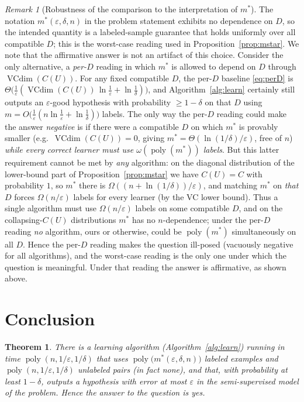 \documentclass{amsart}
\newtheorem{theorem}{Theorem}
\theoremstyle{definition}
\theoremstyle{remark}
\newtheorem{remark}{Remark}
\newcommand{\eps}{\varepsilon}
\DeclareMathOperator{\VCdim}{VCdim}
\DeclareMathOperator{\poly}{poly}
\begin{document}
\begin{remark}[Robustness of the comparison to the interpretation of $m^*$]
\label{rem:robust}
The notation $m^*(\eps,\delta,n)$ in the problem statement exhibits no
dependence on $D$, so the intended quantity is a labeled-sample guarantee that
holds uniformly over all compatible $D$; this is the worst-case reading used in
Proposition~\ref{prop:mstar}. We note that the affirmative answer is not an
artifact of this choice. Consider the only alternative, a \emph{per-$D$} reading
in which $m^*$ is allowed to depend on $D$ through $\VCdim(C(U))$. For any fixed
compatible $D$, the per-$D$ baseline \eqref{eq:perD} is
$\Theta\big(\tfrac1\eps(\VCdim(C(U))\,\ln\tfrac1\eps+\ln\tfrac1\delta)\big)$,
and Algorithm~\ref{alg:learn} certainly still outputs an $\eps$-good hypothesis
with probability $\ge 1-\delta$ on that $D$ using
$m=O\big(\tfrac1\eps(n\ln\tfrac1\eps+\ln\tfrac1\delta)\big)$ labels. The only
way the per-$D$ reading could make the answer \emph{negative} is if there were a
compatible $D$ on which $m^*$ is provably smaller (e.g.\ $\VCdim(C(U))=0$, giving
$m^*=\Theta(\ln(1/\delta)/\eps)$, free of $n$) \emph{while every correct learner
must use $\omega(\poly(m^*))$ labels}. But this latter requirement cannot be met
by \emph{any} algorithm: on the diagonal distribution of the lower-bound part of
Proposition~\ref{prop:mstar} we have $C(U)=C$ with probability $1$, so $m^*$
there is $\Omega((n+\ln(1/\delta))/\eps)$, and matching $m^*$ on \emph{that} $D$
forces $\Omega(n/\eps)$ labels for every learner (by the VC lower bound). Thus a
single algorithm must use $\Omega(n/\eps)$ labels on some compatible $D$, and on
the collapsing-$C(U)$ distributions $m^*$ has no $n$-dependence; under the
per-$D$ reading \emph{no} algorithm, ours or otherwise, could be $\poly(m^*)$
simultaneously on all $D$. Hence the per-$D$ reading makes the question
ill-posed (vacuously negative for all algorithms), and the worst-case reading is
the only one under which the question is meaningful. Under that reading the
answer is affirmative, as shown above.
\end{remark}

\section{Conclusion}

\begin{theorem}
There is a learning algorithm (Algorithm~\ref{alg:learn}) running in time
$\poly(n,1/\eps,1/\delta)$ that uses $\poly\big(m^*(\eps,\delta,n)\big)$ labeled
examples and $\poly(n,1/\eps,1/\delta)$ unlabeled pairs (in fact none), and that,
with probability at least $1-\delta$, outputs a hypothesis with error at most
$\eps$ in the semi-supervised model of the problem. Hence the answer to the
question is \emph{yes}.
\end{theorem}
\end{document}
